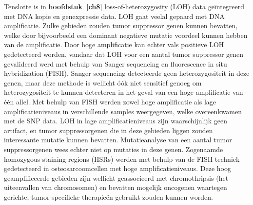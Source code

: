 Tenslotte is in {\bf hoofdstuk~\ref{ch8}} loss\hyp{}of\hyp{}heterozygosity (LOH) data ge\"integreerd met DNA kopie en genexpressie data. LOH gaat veelal gepaard met DNA amplificatie. Zulke gebieden zouden tumor suppressor genen kunnen bevatten, welke door bijvoorbeeld een dominant negatieve mutatie voordeel kunnen hebben van de amplificatie. Door hoge amplificatie kan echter vals positieve LOH gedetecteerd worden, vandaar dat LOH voor een aantal tumor suppressor genen gevalideerd werd met behulp van Sanger sequencing en fluorescence in situ hybridization (FISH). Sanger sequencing detecteerde geen heterozygositeit in deze genen, maar deze methode is wellicht \'{o}\'{o}k niet sensitief genoeg om heterozygositeit te kunnen detecteren in het geval van een hoge amplificatie van \'{e}\'{e}n allel. Met behulp van FISH werden zowel hoge amplificatie als lage amplificatieniveaus in verschillende samples weergegeven, welke overeenkwamen met de SNP data. LOH in lage amplificatieniveaus zijn waarschijnlijk geen artifact, en tumor suppressorgenen die in deze gebieden liggen zouden interessante mutatie kunnen bevatten. Mutatieanalyse van een aantal tumor suppressorgenen wees echter niet op mutaties in deze genen. Zogenaamde homozygous staining regions (HSRs) werden met behulp van de FISH techniek gedetecteerd in osteosarcoomcellen met hoge amplificatieniveaus. Deze hoog geamplificeerde gebieden zijn wellicht geassocieerd met chromothripsis (het uiteenvallen van chromosomen) en bevatten mogelijk oncogenen waartegen gerichte, tumor\hyp{}specifieke therapie\"en gebruikt zouden kunnen worden.

